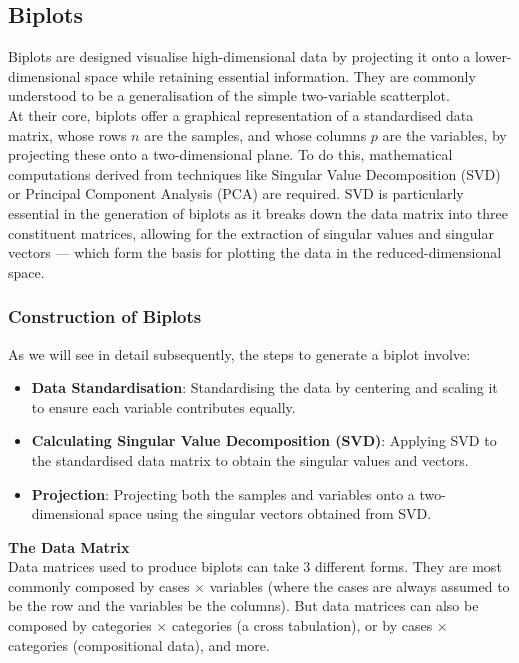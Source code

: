\documentclass{article}\usepackage[]{graphicx}\usepackage[]{xcolor}
\numberwithin{equation}{section}
\begin{document}
{\subsection{Biplots}
\noindent 
Biplots are designed visualise high-dimensional data by projecting it onto a lower-dimensional space while retaining essential information. They are commonly understood to be a generalisation of the simple two-variable scatterplot.\\

\noindent At their core, biplots offer a graphical representation of a standardised data matrix, whose rows \(n\) are the samples, and whose columns \(p\) are the variables, by projecting these onto a two-dimensional plane. To do this, mathematical computations derived from techniques like Singular Value Decomposition (SVD) or Principal Component Analysis (PCA) are required. SVD is particularly essential in the generation of biplots as it breaks down the data matrix into three constituent matrices, allowing for the extraction of singular values and singular vectors — which form the basis for plotting the data in the reduced-dimensional space.

\subsubsection{Construction of Biplots}

\noindent As we will see in detail subsequently, the steps to generate a biplot involve:
\begin{itemize}
    \item \textbf{Data Standardisation}: Standardising the data by centering and scaling it to ensure each variable contributes equally.
    \item \textbf{Calculating Singular Value Decomposition (SVD)}: Applying SVD to the standardised data matrix to obtain the singular values and vectors.
    \item \textbf{Projection}: Projecting both the samples and variables onto a two-dimensional space using the singular vectors obtained from SVD. 
\end{itemize}

\noindent \textbf{The Data Matrix}\\
\noindent Data matrices used to produce biplots can take 3 different forms. They are most commonly composed by cases $\times$ variables (where the cases are always assumed to be the row and the variables be the columns). But data matrices can also be composed by categories $\times$ categories (a cross tabulation), or by cases $\times$ categories (compositional data), and more.\\

}
\end{document}
